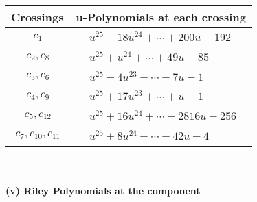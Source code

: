 \documentclass[1p]{elsarticle_modified}
\theoremstyle{definition}
\begin{document}
\begin{tabular}{m{50pt}|m{274pt}}
Crossings & \hspace{64pt}u-Polynomials at each crossing \\
\hline $$\begin{aligned}c_{1}\end{aligned}$$&$\begin{aligned}
&u^{25}-18 u^{24}+\cdots+200 u-192
\end{aligned}$\\
\hline $$\begin{aligned}c_{2},c_{8}\end{aligned}$$&$\begin{aligned}
&u^{25}+u^{24}+\cdots+49 u-85
\end{aligned}$\\
\hline $$\begin{aligned}c_{3},c_{6}\end{aligned}$$&$\begin{aligned}
&u^{25}-4 u^{23}+\cdots+7 u-1
\end{aligned}$\\
\hline $$\begin{aligned}c_{4},c_{9}\end{aligned}$$&$\begin{aligned}
&u^{25}+17 u^{23}+\cdots+u-1
\end{aligned}$\\
\hline $$\begin{aligned}c_{5},c_{12}\end{aligned}$$&$\begin{aligned}
&u^{25}+16 u^{24}+\cdots-2816 u-256
\end{aligned}$\\
\hline $$\begin{aligned}c_{7},c_{10},c_{11}\end{aligned}$$&$\begin{aligned}
&u^{25}+8 u^{24}+\cdots-42 u-4
\end{aligned}$\\
\hline
\end{tabular}\\~\\
\newpage\renewcommand{\arraystretch}{1}
\flushleft \textbf{(v) Riley Polynomials at the component}\newline \\
\end{document}
